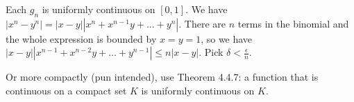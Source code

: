 \documentclass{oxmathproblems}
\begin{document}
\begin{questions}
\begin{solution}
\begin{enumerate}[label=(\alph*)]
    Each $g_{n}$ is uniformly continuous on $[0, 1]$. We have $|x^{n}-y^{n}| = |x-y||x^{n}+x^{n-1}{y}+...+y^{n}|$. There are $n$ terms in the binomial and
    the whole expression is bounded by $x=y=1$, so we have $|x-y||x^{n-1}+x^{n-2}{y}+...+y^{n-1}| \leq n|x-y|$. Pick $\delta < \frac{\epsilon}{n}$.

    Or more compactly (pun intended), use Theorem 4.4.7: a function that is continuous on a compact set $K$ is uniformly continuous on $K$.
  \end{enumerate}
\end{solution}

\end{questions}
\end{document}
